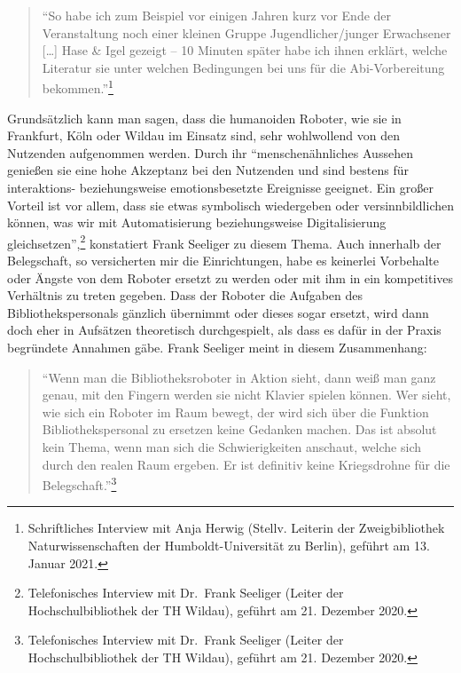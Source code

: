\documentclass[a4paper,
fontsize=11pt,
oneside,
numbers=noperiodatend,
parskip=half-,
bibliography=totoc,
final
]{scrartcl}
\begin{document}
 \begin{quote} 
\enquote{So habe ich zum Beispiel vor einigen
Jahren kurz vor Ende der Veranstaltung noch einer kleinen Gruppe
Jugendlicher/junger Erwachsener {[}\ldots{]} Hase \& Igel gezeigt -- 10
Minuten später habe ich ihnen erklärt, welche Literatur sie unter
welchen Bedingungen bei uns für die Abi-Vorbereitung
bekommen.}\footnote{Schriftliches Interview mit Anja Herwig (Stellv.
  Leiterin der Zweigbibliothek Naturwissenschaften der
  Humboldt-Universität zu Berlin), geführt am 13. Januar 2021.}
  \end{quote} 

Grundsätzlich kann man sagen, dass die humanoiden Roboter, wie sie in
Frankfurt, Köln oder Wildau im Einsatz sind, sehr wohlwollend von den
Nutzenden aufgenommen werden. Durch ihr \enquote{menschenähnliches
Aussehen genießen sie eine hohe Akzeptanz bei den Nutzenden und sind
bestens für interaktions- beziehungsweise emotionsbesetzte Ereignisse
geeignet. Ein großer Vorteil ist vor allem, dass sie etwas symbolisch
wiedergeben oder versinnbildlichen können, was wir mit Automatisierung
beziehungsweise Digitalisierung gleichsetzen},\footnote{Telefonisches
  Interview mit Dr.~Frank Seeliger (Leiter der Hochschulbibliothek der
  TH Wildau), geführt am 21. Dezember 2020.} konstatiert Frank Seeliger
zu diesem Thema. Auch innerhalb der Belegschaft, so versicherten mir die
Einrichtungen, habe es keinerlei Vorbehalte oder Ängste von dem Roboter
ersetzt zu werden oder mit ihm in ein kompetitives Verhältnis zu treten
gegeben. Dass der Roboter die Aufgaben des Bibliothekspersonals gänzlich
übernimmt oder dieses sogar ersetzt, wird dann doch eher in Aufsätzen
theoretisch durchgespielt, als dass es dafür in der Praxis begründete
Annahmen gäbe. Frank Seeliger meint in diesem Zusammenhang:

\begin{quote}
\enquote{Wenn man die Bibliotheksroboter in Aktion sieht, dann weiß man
ganz genau, mit den Fingern werden sie nicht Klavier spielen können. Wer
sieht, wie sich ein Roboter im Raum bewegt, der wird sich über die
Funktion Bibliothekspersonal zu ersetzen keine Gedanken machen. Das ist
absolut kein Thema, wenn man sich die Schwierigkeiten anschaut, welche
sich durch den realen Raum ergeben. Er ist definitiv keine Kriegsdrohne
für die Belegschaft.}\footnote{Telefonisches
  Interview mit Dr.~Frank Seeliger (Leiter der Hochschulbibliothek der
  TH Wildau), geführt am 21. Dezember 2020.}
\end{quote}
\end{document}
